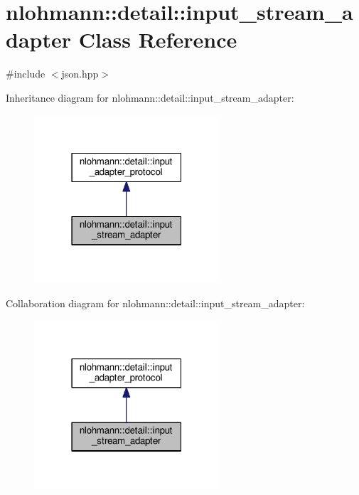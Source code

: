 \hypertarget{classnlohmann_1_1detail_1_1input__stream__adapter}{}\section{nlohmann\+:\+:detail\+:\+:input\+\_\+stream\+\_\+adapter Class Reference}
\label{classnlohmann_1_1detail_1_1input__stream__adapter}


{\ttfamily \#include $<$json.\+hpp$>$}



Inheritance diagram for nlohmann\+:\+:detail\+:\+:input\+\_\+stream\+\_\+adapter\+:\nopagebreak
\begin{figure}[H]
\begin{center}
\leavevmode
\includegraphics[width=195pt]{classnlohmann_1_1detail_1_1input__stream__adapter__inherit__graph}
\end{center}
\end{figure}


Collaboration diagram for nlohmann\+:\+:detail\+:\+:input\+\_\+stream\+\_\+adapter\+:\nopagebreak
\begin{figure}[H]
\begin{center}
\leavevmode
\includegraphics[width=195pt]{classnlohmann_1_1detail_1_1input__stream__adapter__coll__graph}
\end{center}
\end{figure}
